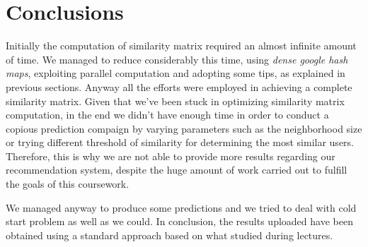 \section{Conclusions}

Initially the computation of similarity matrix required an almost infinite amount of time. We managed to reduce considerably this time, using \textit{dense google hash maps}, exploiting parallel computation and adopting some tips, as explained in previous sections. Anyway all the efforts were employed in achieving a complete similarity matrix. Given that we've been stuck in optimizing similarity matrix computation, in the end we didn't have enough time in order to conduct a copious prediction compaign by varying parameters such as the neighborhood size or trying different threshold of similarity for determining the most similar users. Therefore, this is why we are not able to provide more results regarding our recommendation system, despite the huge amount of work carried out to fulfill the goals of this coursework.

We managed anyway to produce some predictions and we tried to deal with cold start problem as well as we could. In conclusion, the results uploaded have been obtained using a standard approach based on what studied during lectures.
